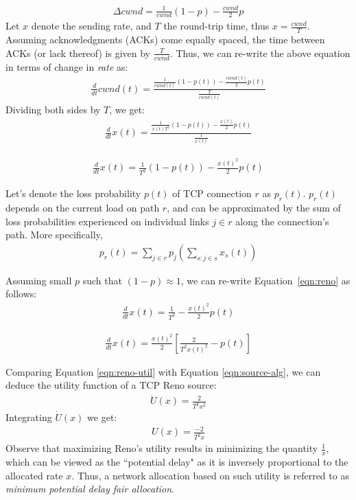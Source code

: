 \documentclass{article}
\begin{document}
\begin{eqnarray*}
\Delta cwnd = \frac{1}{cwnd} (1-p) - \frac{cwnd}{2} p
\end{eqnarray*}
Let $x$ denote the sending rate, and $T$ the round-trip time, thus $x = \frac{cwnd}{T}$.
Assuming acknowledgments (ACKs) come equally spaced, 
the time between ACKs (or lack thereof) is given by $\frac{T}{cwnd}$.
Thus, we can re-write the above equation in terms of change in {\em rate} as:
\begin{eqnarray*}
\frac{d}{dt}  cwnd(t) = \frac{\frac{1}{cwnd(t)} (1-p(t)) - \frac{cwnd(t)}{2} p(t)}{\frac{T}{cwnd(t)}}
\end{eqnarray*}
Dividing both sides by $T$, we get:
\begin{eqnarray*}
\frac{d}{dt} x(t) = \frac{\frac{1}{x(t) T^2} (1-p(t)) - \frac{x(t)}{2} p(t)}{\frac{1}{x(t)}}
\end{eqnarray*}


\begin{eqnarray}
\frac{d}{dt} x(t) = \frac{1}{T^2} (1-p(t)) - \frac{{x(t)}^2}{2} p(t)
\label{eqn:reno}
\end{eqnarray}


Let's denote the loss probability $p(t)$ of TCP connection $r$ as $p_r(t)$.
$p_r(t)$ depends on the current load on path $r$,
and can be approximated by the sum of loss probabilities experienced on individual links $j \in r$ 
along the connection's path.
More specifically,
\begin{eqnarray*}
p_r(t) = \sum_{j \in r} p_j(\sum_{s: j \in s} x_s(t))
\end{eqnarray*}


Assuming small $p$ such that $(1-p) \approx 1$, we can re-write Equation~\ref{eqn:reno} as follows:
\begin{eqnarray*}
\frac{d}{dt} x(t) = \frac{1}{T^2}  - \frac{{x(t)}^2}{2} p(t)
\end{eqnarray*}

\begin{eqnarray}
\frac{d}{dt} x(t) = \frac{{x(t)}^2}{2} [\frac{2}{T^2 x(t)^2}  - p(t)]
\label{eqn:reno-util}
\end{eqnarray}

Comparing Equation \ref{eqn:reno-util} with Equation \ref{eqn:source-alg},
we can deduce the utility function of a TCP Reno source:
\begin{eqnarray*}
\dot{U}(x) = \frac{2}{T^2 x^2} 
\end{eqnarray*}
Integrating $\dot{U}(x)$ we get:
\begin{eqnarray*}
U(x) =  \frac{-2}{T^2 x} 
\end{eqnarray*}
Observe that maximizing Reno's utility results in minimizing the quantity $\frac{1}{x}$, which can be viewed as the ``potential delay" as it is inversely proportional to the allocated rate $x$. 
Thus, a network allocation based on such utility is referred to as {\em minimum potential delay fair allocation}.
\end{document}
